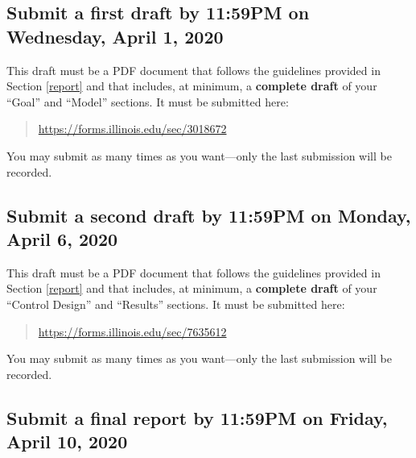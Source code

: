 \documentclass[conf]{new-aiaa}
\begin{document}
\subsection{Submit a first draft by 11:59PM on Wednesday, April 1, 2020}
\label{secDraft01}

This draft must be a PDF document that follows the guidelines provided in Section \ref{report} and that includes, at minimum, a {\bf complete draft} of your ``Goal'' and ``Model'' sections. It must be submitted here:
\begin{quote}
\url{https://forms.illinois.edu/sec/3018672}
\end{quote}
You may submit as many times as you want---only the last submission will be recorded.

\subsection{Submit a second draft by 11:59PM on Monday, April 6, 2020}
\label{secDraft02}

This draft must be a PDF document that follows the guidelines provided in Section \ref{report} and that includes, at minimum, a {\bf complete draft} of your ``Control Design'' and ``Results'' sections. It must be submitted here:
\begin{quote}
\url{https://forms.illinois.edu/sec/7635612}
\end{quote}
You may submit as many times as you want---only the last submission will be recorded.

\subsection{Submit a final report by 11:59PM on Friday, April 10, 2020}
\end{document}

